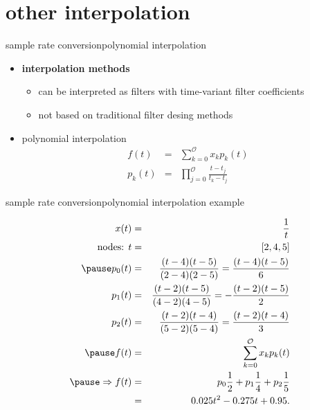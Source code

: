 \section{other interpolation}
	\begin{frame}{sample rate conversion}{polynomial interpolation}
        \begin{itemize}
            \item   \textbf{interpolation methods }
                \begin{itemize}
                    \item   can be interpreted as filters with time-variant filter coefficients
                    \item   not based on traditional filter desing methods
                \end{itemize}
            \bigskip
            \item<2->   polynomial interpolation
                \begin{eqnarray*}
                    f(t) &=& \sum\limits_{k=0}^\mathcal{O}x_k p_k(t)\\
                    p_k(t) &=& \prod\limits_{j=0}^\mathcal{O}\frac{t-t_j}{t_k-t_j}
                \end{eqnarray*}
        \end{itemize}
    \end{frame}
	\begin{frame}{sample rate conversion}{polynomial interpolation example}
        \vspace{-5mm}
        \begin{footnotesize}
        \begin{eqnarray*}
            x(t) &=& \frac{1}{t}\\
            \text{nodes: } t &=& [2, 4, 5]\\
            \pause
            p_0(t) &=& \frac{(t-4)(t-5)}{(2-4)(2-5)} = \frac{(t-4)(t-5)}{6}\\
            p_1(t) &=& \frac{(t-2)(t-5)}{(4-2)(4-5)} = -\frac{(t-2)(t-5)}{2}\\
            p_2(t) &=& \frac{(t-2)(t-4)}{(5-2)(5-4)} = \frac{(t-2)(t-4)}{3}\\
            \pause
             f(t) &=& \sum\limits_{k=0}^\mathcal{O}x_k p_k(t)\\
            \pause
            \Rightarrow f(t) &=& p_0\frac{1}{2}+p_1\frac{1}{4}+p_2\frac{1}{5}\\
            &=& 0.025t^2 - 0.275t + 0.95 .
        \end{eqnarray*}
        \end{footnotesize}
    \end{frame}
